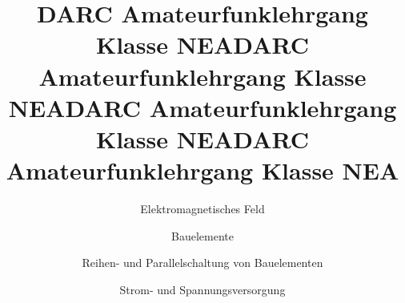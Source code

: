 \documentclass[aspectratio = 169]{beamer}
\begin{document}
\title{DARC Amateurfunklehrgang Klasse NEA}
\author{Elektromagnetisches Feld}
\begin{frame}
\maketitle
\end{frame}





\title{DARC Amateurfunklehrgang Klasse NEA}
\author{Bauelemente}
\begin{frame}
\maketitle
\end{frame}














\title{DARC Amateurfunklehrgang Klasse NEA}
\author{Reihen- und Parallelschaltung von Bauelementen}
\begin{frame}
\maketitle
\end{frame}










\title{DARC Amateurfunklehrgang Klasse NEA}
\author{Strom- und Spannungsversorgung}
\begin{frame}
\maketitle
\end{frame}


















\end{document}
